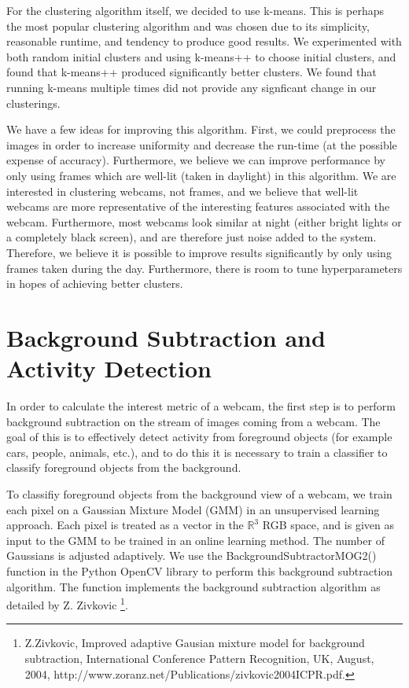 \documentclass{article}
\begin{document}
For the clustering algorithm itself, we decided to use k-means. This is perhaps
the most popular clustering algorithm and was chosen due to its simplicity,
reasonable runtime, and tendency to produce good results. We experimented with
both random initial clusters and using k-means++ to choose initial clusters,
and found that k-means++ produced significantly better clusters. We found
that running k-means multiple times did not provide any signficant change in
our clusterings.

We have a few ideas for improving this algorithm. First, we could preprocess
the images in order to increase uniformity and decrease the run-time (at the
possible expense of accuracy). Furthermore, we believe we can improve
performance by only using frames which are well-lit (taken in daylight) in
this algorithm. We are interested in clustering webcams, not frames, and we
believe that well-lit webcams are more representative of the interesting
features associated with the webcam. Furthermore, most webcams look similar at
night (either bright lights or a completely black screen), and are therefore
just noise added to the system. Therefore, we believe it is possible to improve
results significantly by only using frames taken during the day. Furthermore, there
is room to tune hyperparameters in hopes of achieving better clusters.


\section{Background Subtraction and Activity Detection}
In order to calculate the interest metric of a webcam, the first step is to
perform background subtraction on the stream of images coming from a webcam.
The goal of this is to effectively detect activity from foreground objects (for
example cars, people, animals, etc.), and to do this it is necessary to train a
classifier to classify foreground objects from the background.

To classifiy foreground objects from the background view of a webcam, we train
each pixel on a Gaussian Mixture Model (GMM) in an unsupervised learning
approach. Each pixel is treated as a vector in the $\mathbb{R}^3$ RGB space,
and is given as input to the GMM to be trained in an online learning method.
The number of Gaussians is adjusted adaptively. We use the
BackgroundSubtractorMOG2() function in the Python OpenCV library to perform
this background subtraction algorithm. The function implements the background
subtraction algorithm as detailed by Z. Zivkovic \footnote{Z.Zivkovic, Improved
adaptive Gausian mixture model for background subtraction, International
Conference Pattern Recognition, UK, August, 2004,
http://www.zoranz.net/Publications/zivkovic2004ICPR.pdf.}.
\end{document}
